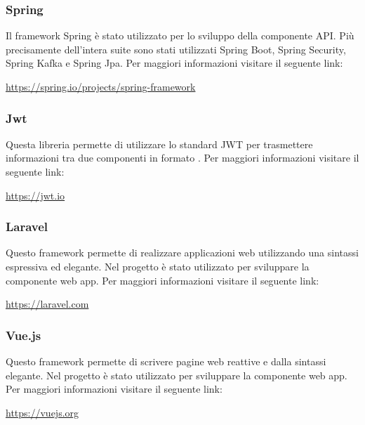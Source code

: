 		\subsubsection{Spring}
			Il framework Spring è stato utilizzato per lo sviluppo della componente API. Più precisamente dell'intera suite sono stati utilizzati Spring Boot, Spring Security, Spring Kafka e Spring Jpa.
			\newline
			Per maggiori informazioni visitare il seguente link:
			\newline
			\begin{center}
				\url{https://spring.io/projects/spring-framework}
			\end{center}
		\subsubsection{Jwt}
			Questa libreria permette di utilizzare lo standard JWT per trasmettere informazioni tra due componenti in formato .
			\newline
			Per maggiori informazioni visitare il seguente link:
			\newline
			\begin{center}
				\url{https://jwt.io}
			\end{center}
		\subsubsection{Laravel}
			Questo framework permette di realizzare applicazioni web utilizzando una sintassi espressiva ed elegante. Nel progetto è stato utilizzato per sviluppare la componente web app.
			\newline
			Per maggiori informazioni visitare il seguente link:
			\newline
			\begin{center}
				\url{https://laravel.com}
			\end{center}
		\subsubsection{Vue.js}
			Questo framework permette di scrivere pagine web reattive e dalla sintassi elegante. Nel progetto è stato utilizzato per sviluppare la componente web app.
			\newline
			Per maggiori informazioni visitare il seguente link:
			\newline
			\begin{center}
				\url{https://vuejs.org}
			\end{center}
